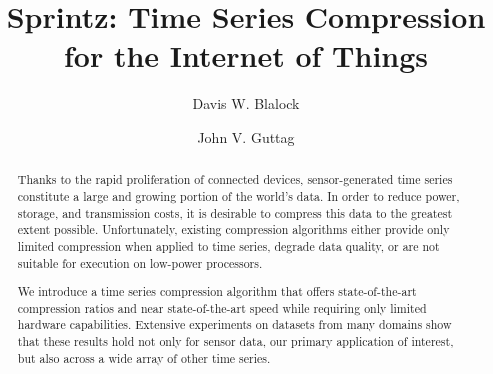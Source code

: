 \documentclass[sigconf]{acmart}  %
\begin{document}



\title{Sprintz: Time Series Compression for the Internet of Things}

\author{Davis W. Blalock}

\author{John V. Guttag}

\begin{abstract}


Thanks to the rapid proliferation of connected devices, sensor-generated time series constitute a large and growing portion of the world's data. In order to reduce power, storage, and transmission costs, it is desirable to compress this data to the greatest extent possible. Unfortunately, existing compression algorithms either provide only limited compression when applied to time series, degrade data quality, or are not suitable for execution on low-power processors.

We introduce a time series compression algorithm that offers state-of-the-art compression ratios and near state-of-the-art speed while requiring only limited hardware capabilities. Extensive experiments on datasets from many domains show that these results hold not only for sensor data, our primary application of interest, but also across a wide array of other time series. %

\end{abstract}
\end{document}
